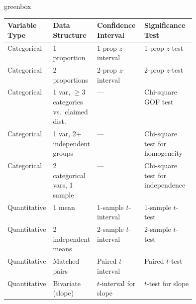 \documentclass[10pt]{article}
\begin{document}
\begin{skillbox}{greenbox}
\renewcommand{\arraystretch}{1.8}
\begin{tabularx}{\linewidth}{@{} p{0.22\linewidth} p{0.22\linewidth} X X @{}}
  \rowcolor{sky}
  \textbf{Variable Type} & \textbf{Data Structure} & \textbf{Confidence Interval} & \textbf{Significance Test} \\
  \hline
  Categorical & 1 proportion & 1-prop $z$-interval & 1-prop $z$-test \\
  Categorical & 2 proportions & 2-prop $z$-interval & 2-prop $z$-test \\
  Categorical & 1 var, $\ge 3$ categories vs.\ claimed dist. & --- & Chi-square GOF test \\
  Categorical & 1 var, 2+ independent groups & --- & Chi-square test for homogeneity \\
  Categorical & 2 categorical vars, 1 sample & --- & Chi-square test for independence \\
  Quantitative & 1 mean & 1-sample $t$-interval & 1-sample $t$-test \\
  Quantitative & 2 independent means & 2-sample $t$-interval & 2-sample $t$-test \\
  Quantitative & Matched pairs & Paired $t$-interval & Paired $t$-test \\
  Quantitative & Bivariate (slope) & $t$-interval for slope & $t$-test for slope \\
\end{tabularx}
\end{skillbox}
\end{document}
